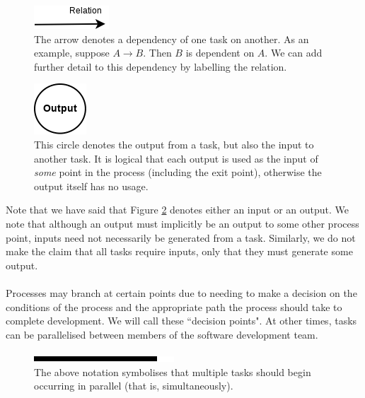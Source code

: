 \begin{figure}[ht!]
\centering
\includegraphics[scale=0.6]{media/Dependency}
\caption{The arrow denotes a dependency of one task on another. As an example, suppose $A \to B$.
	Then $B$ is dependent on $A$.
We can add further detail to this dependency by labelling the relation.}
\label{depFigure}
\end{figure}

\begin{figure}[ht!]
\centering
\includegraphics[scale=0.6]{media/Output}
\caption{This circle denotes the output from a task, but also the input to another task. It
is logical that each output is used as the input of {\em some} point in the process (including the
		exit point), otherwise the output itself has no usage.}
\label{outputFigure}
\end{figure}

\pagebreak %

Note that we have said that Figure \ref{outputFigure} denotes either an input or an
output.
We note that although an output must implicitly be an output to some other
process point, inputs need not necessarily be generated from a task.
Similarly, we do not make the claim that all tasks require inputs, only that
they must generate some output.\\
\\
Processes may branch at certain points due to needing to make a decision on the conditions of the
process and the appropriate path the process should take to complete development.
We will call these ``decision points".
At other times, tasks can be parallelised between members of the software development team.

\pagebreak


\begin{figure}[ht!]
\centering
\centering
\includegraphics[scale=0.6]{media/Parallelised}
\caption{The above notation symbolises that multiple tasks should begin occurring in parallel (that
		is, simultaneously).}
\label{parFigure}
\end{figure}

